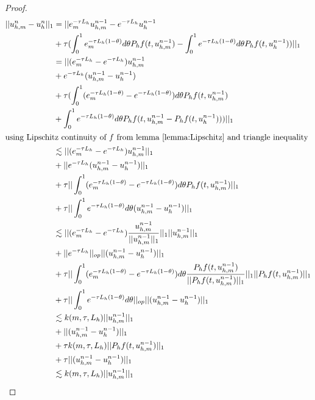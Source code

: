 \begin{proof}
    \begin{align*}
        ||u_{h,m}^n - u_{h}^n||_1 &= ||e_m^{-\tau L_h}u_{h,m}^{n-1} - e^{-\tau L_h}u_{h}^{n-1}\\
        & + \tau(\int^1_0e_m^{-\tau L_h(1-\theta)}d\theta P_hf(t, u_{h,m}^{n-1}) - \int^1_0e^{-\tau L_h(1-\theta)}d\theta P_hf(t, u_{h}^{n-1}))||_1\\
        &= ||(e_m^{-\tau L_h}-e^{-\tau L_h})u_{h,m}^{n-1} \\
        & + e^{-\tau L_h}(u_{h,m}^{n-1}-u_{h}^{n-1})\\
        & + \tau(\int^1_0 (e_m^{-\tau L_h(1-\theta)}-e^{-\tau L_h(1-\theta)}) d\theta P_hf(t, u_{h,m}^{n-1})\\
        & + \int^1_0e^{-\tau L_h(1-\theta)}d\theta P_hf(t, u_{h,m}^{n-1}- P_hf(t, u_{h}^{n-1})))||_1\\
        \intertext{using Lipschitz continuity of $f$ from lemma \ref{lemma:Lipschitz} and triangle inequality}
        & \lesssim ||(e_m^{-\tau L_h}-e^{-\tau L_h})u_{h,m}^{n-1}||_1 \\
        & + ||e^{-\tau L_h}(u_{h,m}^{n-1}-u_{h}^{n-1})||_1 \\
        & + \tau||\int^1_0 (e_m^{-\tau L_h(1-\theta)}-e^{-\tau L_h(1-\theta)}) d\theta P_hf(t, u_{h,m}^{n-1})||_1 \\
        & + \tau||\int^1_0e^{-\tau L_h(1-\theta)}d\theta (u_{h,m}^{n-1}- u_{h}^{n-1})||_1 \\
        & \lesssim ||(e_m^{-\tau L_h}-e^{-\tau L_h})\frac{u_{h,m}^{n-1}}{||u_{h,m}^{n-1}||_1}||_1||u_{h,m}^{n-1}||_1 \\
        & + ||e^{-\tau L_h}||_{op}||(u_{h,m}^{n-1}-u_{h}^{n-1})||_1 \\
        & + \tau||\int^1_0 (e_m^{-\tau L_h(1-\theta)}-e^{-\tau L_h(1-\theta)}) d\theta \frac{P_hf(t, u_{h,m}^{n-1})}{|| P_hf(t, u_{h,m}^{n-1})||_1}||_1|| P_hf(t, u_{h,m}^{n-1})||_1 \\
        & + \tau||\int^1_0e^{-\tau L_h(1-\theta)}d\theta||_{op}|| (u_{h,m}^{n-1}- u_{h}^{n-1})||_1 \\
        & \lesssim k(m,\tau, L_h)||u_{h,m}^{n-1}||_1 \\
        & + ||(u_{h,m}^{n-1}-u_{h}^{n-1})||_1 \\
        & + \tau k(m,\tau, L_h)|| P_hf(t, u_{h,m}^{n-1})||_1 \\
        & + \tau||(u_{h,m}^{n-1}- u_{h}^{n-1})||_1 \\
        & \lesssim k(m,\tau, L_h)||u_{h,m}^{n-1}||_1 \\

\end{align*}
\end{proof}
